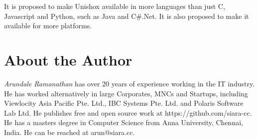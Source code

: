 \documentclass[]{article}
\begin{document}
It is proposed to make Unishox available in more languages than just C, Javascript and Python, such as Java and C\#.Net. It is also proposed to make it available for more platforms.

\section{About the Author}

\emph{Arundale Ramanathan} has over 20 years of experience working in the IT industry. He has worked alternatively in large Corporates, MNCs and Startups, including Viewlocity Asia Pacific Pte. Ltd., IBC Systems Pte. Ltd. and Polaris Software Lab Ltd. He publishes free and open source work at https://github.com/siara-cc. He has a masters degree in Computer Science from Anna University, Chennai, India. He can be reached at arun@siara.cc.
\end{document}
